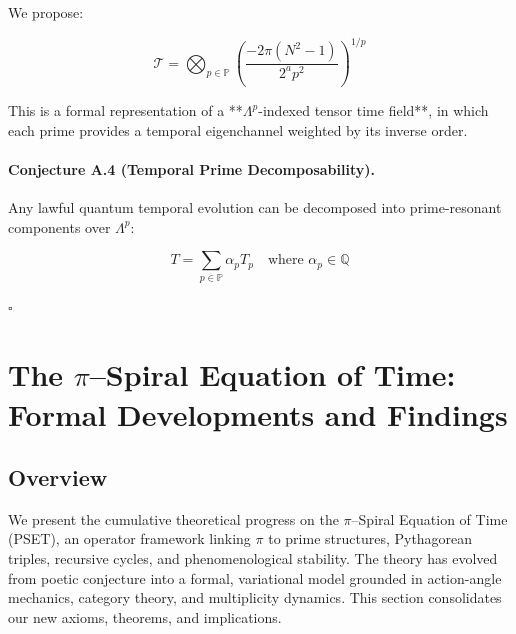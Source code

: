 \documentclass[12]{amsart}
\theoremstyle{plain}
\begin{document}
We propose:

\[
\mathcal{T} = \bigotimes_{p \in \mathbb{P}} \left( \frac{-2\pi(N^2 - 1)}{2^a p^2} \right)^{1/p}
\]

This is a formal representation of a **$\Lambda^p$-indexed tensor time field**, in which each prime provides a temporal eigenchannel weighted by its inverse order.

\paragraph{Conjecture A.4 (Temporal Prime Decomposability).}  
Any lawful quantum temporal evolution can be decomposed into prime-resonant components over $\Lambda^p$:

\[
T = \sum_{p \in \mathbb{P}} \alpha_p T_p \quad \text{where } \alpha_p \in \mathbb{Q}
\]

\hfill\(\square\)

\section{The $\pi$--Spiral Equation of Time: Formal Developments and Findings}

\subsection{Overview}
We present the cumulative theoretical progress on the $\pi$--Spiral Equation of Time (PSET), an operator framework linking $\pi$ to prime structures, Pythagorean triples, recursive cycles, and phenomenological stability. The theory has evolved from poetic conjecture into a formal, variational model grounded in action-angle mechanics, category theory, and multiplicity dynamics. This section consolidates our new axioms, theorems, and implications.
\end{document}
